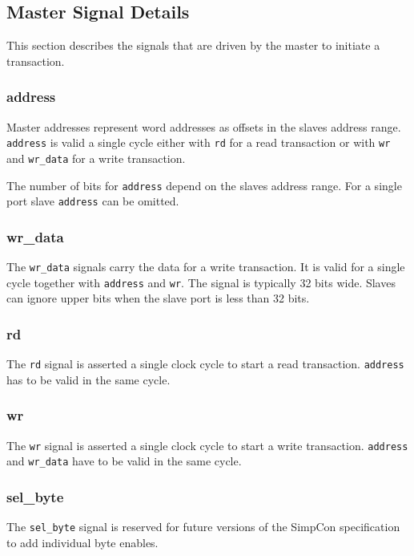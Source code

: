 \documentclass[a4paper,12pt]{scrartcl}
\newcommand{\sign}[1]{{\texttt{#1}}}
\begin{document}
\subsection{Master Signal Details}

This section describes the signals that are driven by the master to
initiate a transaction.

\subsubsection{address}

Master addresses represent word addresses as offsets in the slaves
address range. \sign{address} is valid a single cycle either with
\sign{rd} for a read transaction or with \sign{wr} and
\sign{wr\_data} for a write transaction.

The number of bits for \sign{address} depend on the slaves address
range. For a single port slave \sign{address} can be omitted.

\subsubsection{wr\_data}

The \sign{wr\_data} signals carry the data for a write transaction.
It is valid for a single cycle together with \sign{address} and
\sign{wr}. The signal is typically 32 bits wide. Slaves can ignore
upper bits when the slave port is less than 32 bits.

\subsubsection{rd}

The \sign{rd} signal is asserted a single clock cycle to start a
read transaction. \sign{address} has to be valid in the same cycle.

\subsubsection{wr}

The \sign{wr} signal is asserted a single clock cycle to start a
write transaction. \sign{address} and \sign{wr\_data} have to be
valid in the same cycle.

\subsubsection{sel\_byte}

The \sign{sel\_byte} signal is reserved for future versions of the
SimpCon specification to add individual byte enables.
\end{document}
